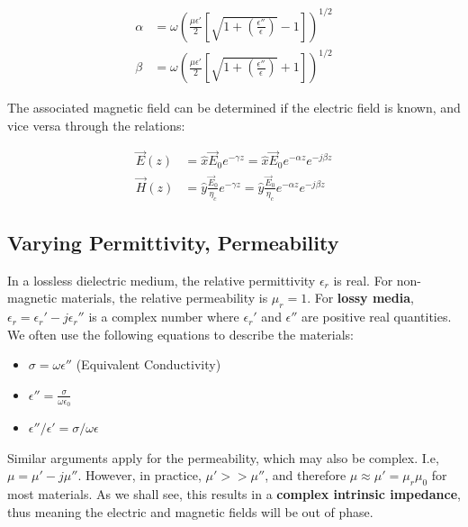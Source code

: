 \documentclass{book}
\begin{document}
\begin{align*}
	\alpha &= \omega ({ \frac{\mu \epsilon'}{2} [\sqrt{1 + (\frac{\epsilon ''}{\epsilon})} -1]})^{1/2} \\
	\beta &= \omega ({ \frac{\mu \epsilon'}{2} [ \sqrt{1+ (\frac{\epsilon ''}{\epsilon})} + 1]})^{1/2} 
\end{align*} 

The associated magnetic field can be determined if the electric field is known, and vice versa through the relations:

\begin{align*}
	\vec{E}(z) &= \hat{x} \vec{E}_{0} e^{-\gamma z} = \hat{x} \vec{E}_{0} e^{-\alpha z}e^{-j \beta z} \\
	\vec{H}(z) &= \hat{y} \frac{\vec{E}_{0}}{\eta_c} e^{-\gamma z}	= \hat{y} \frac{\vec{E}_{0}}{\eta_c} e^{-\alpha z}e^{-j \beta z}
\end{align*}


\subsection{Varying Permittivity, Permeability}
In a lossless dielectric medium, the relative permittivity $\epsilon_r$ is real. For non-magnetic materials, the relative permeability is $\mu_r = 1$. For \textbf{lossy media}, $\epsilon_r = \epsilon_r ' - j\epsilon_r''$ is a complex number where $\epsilon_r'$ and $\epsilon''$ are positive real quantities. We often use the following equations to describe the materials:
\begin{itemize}
	\item $\sigma = \omega \epsilon''$ (Equivalent Conductivity)
	\item $\epsilon'' = \frac{\sigma}{\omega \epsilon_0}$
	\item $\epsilon'' / \epsilon' = \sigma/\omega \epsilon$
\end{itemize}


Similar arguments apply for the permeability, which may also be complex. I.e, $\mu = \mu ' - j \mu''$. However, in practice, $\mu ' >> \mu ''$, and therefore $\mu \approx \mu' = \mu_r \mu_0$ for most materials. As we shall see, this results in a \textbf{complex intrinsic impedance}, thus meaning the electric and magnetic fields will be out of phase.
\end{document}
